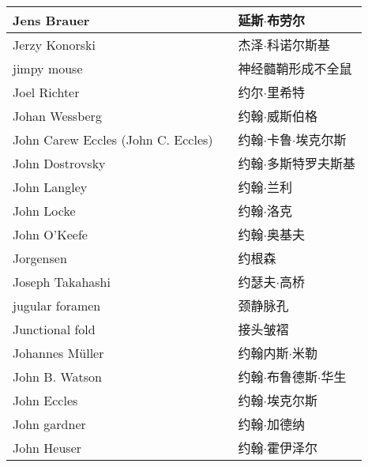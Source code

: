 \begin{longtable}{lll}
	\midrule
	Jens Brauer   && 延斯$\cdot$布劳尔  \\
	
	\midrule
	Jerzy Konorski   && 杰泽$\cdot$科诺尔斯基  \\
	
	\midrule
	jimpy mouse   && 神经髓鞘形成不全鼠  \\
	
	\midrule
	Joel Richter   && 约尔$\cdot$里希特  \\
	
	\midrule
	Johan Wessberg   && 约翰$\cdot$威斯伯格  \\
	
	\midrule
	John Carew Eccles (John C. Eccles)   && 约翰$\cdot$卡鲁$\cdot$埃克尔斯  \\
	
	\midrule
	John Dostrovsky   && 约翰$\cdot$多斯特罗夫斯基  \\
	
	\midrule
	John Langley   && 约翰$\cdot$兰利  \\
	
	\midrule
	John Locke   && 约翰$\cdot$洛克  \\
	
	\midrule
	John O’Keefe   && 约翰$\cdot$奥基夫  \\
	
	\midrule
	Jorgensen   && 约根森  \\
	
	\midrule
	Joseph Takahashi   && 约瑟夫$\cdot$高桥  \\
	
	\midrule
	jugular foramen   && 颈静脉孔  \\
	
	\midrule
	Junctional fold   && 接头皱褶  \\
	
	\midrule
	Johannes Müller   && 约翰内斯$\cdot$米勒  \\
	
	\midrule
	John B. Watson   && 约翰$\cdot$布鲁德斯$\cdot$华生  \\
	
	\midrule
	John Eccles   && 约翰$\cdot$埃克尔斯  \\
	
	\midrule
	John gardner   && 约翰$\cdot$加德纳  \\
	
	\midrule
	John Heuser   && 约翰$\cdot$霍伊泽尔  \\
	

\end{longtable}
